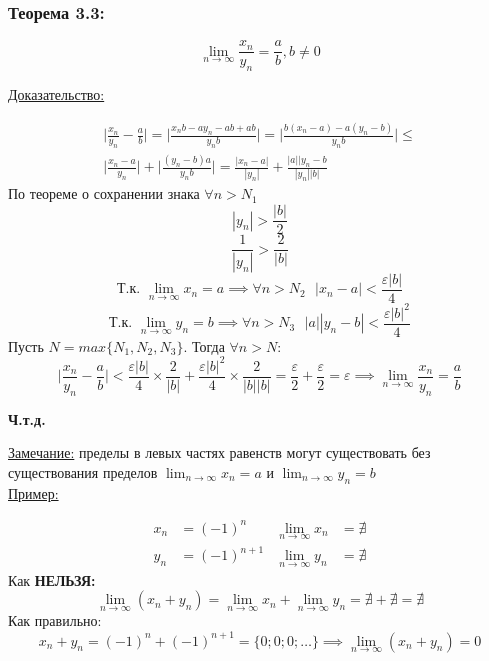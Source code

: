 \documentclass[12pt]{article}
\begin{document}
    \subsubsection*{Теорема 3.3:}
    \[ \lim_{n\to\infty}\frac{x_n}{y_n} = \frac{a}{b}, b \ne 0 \]\par\noindent
    \underline{Доказательство:}\par
    \begin{adjustwidth}{1.5em}{1.5em}
        \begin{gather*}
            \Big|\frac{x_n}{y_n} - \frac{a}{b}\Big| = \Big|\frac{x_nb-ay_n-ab+ab}{y_nb}\Big| = \Big|\frac{b(x_n-a)-a(y_n-b)}{y_nb}\Big| \le\\
            \Big|\frac{x_n-a}{y_n}\Big| + \Big|\frac{(y_n-b)a}{y_nb}\Big| = \frac{|x_n-a|}{|y_n|}+\frac{|a||y_n-b}{|y_n||b|}
        \end{gather*}
        По теореме о сохранении знака $\forall n > N_{1}$
        \[|y_n| > \frac{|b|}{2}\]
        \[\frac{1}{|y_n|} > \frac{2}{|b|}\]
        \[\text{Т.к. }\lim_{n\to\infty}x_n = a \implies \forall n > N_{2} \text{ } |x_n - a| < \frac{\varepsilon|b|}{4}\]
        \[\text{Т.к. }\lim_{n\to\infty}y_n = b \implies \forall n > N_{3} \text{ } |a||y_n - b| < \frac{\varepsilon|b|^{2}}{4}\]
        Пусть $N = max\{N_{1}, N_{2}, N_{3}\}$. Тогда $\forall n > N$:
        \[ \Big|\frac{x_n}{y_n} - \frac{a}{b}\Big| < \frac{\varepsilon|b|}{4} \times \frac{2}{|b|} + \frac{\varepsilon|b|^{2}}{4} \times \frac{2}{|b||b|} = \frac{\varepsilon}{2} + \frac{\varepsilon}{2} = \varepsilon \implies \lim_{n\to\infty}\frac{x_n}{y_n} = \frac{a}{b} \]
        \begin{center}
            \textbf{Ч.т.д.}
        \end{center}
    \end{adjustwidth}
    \underline{Замечание:} пределы в левых частях равенств могут существовать без существования пределов $\lim_{n\to\infty} x_n = a$ и $\lim_{n\to\infty} y_n = b$\\
    \underline{Пример:}
    \begin{adjustwidth}{1.5em}{1.5em}
        \begin{align*}
            x_n &= (-1)^n & \lim_{n\to\infty} x_n &= \nexists\\
            y_n &= (-1)^{n+1} & \lim_{n\to\infty} y_n &= \nexists
        \end{align*}
        Как \textbf{НЕЛЬЗЯ:}
        \[ \lim_{n\to\infty} (x_n + y_n) = \lim_{n\to\infty}x_n + \lim_{n\to\infty}y_n = \nexists + \nexists = \nexists \]
        Как правильно:
        \[ x_n + y_n = (-1)^n + (-1)^{n+1} = \{0;0;0;\dots\} \implies \lim_{n\to\infty}(x_n+y_n) = 0 \]
    \end{adjustwidth}
\end{document}
